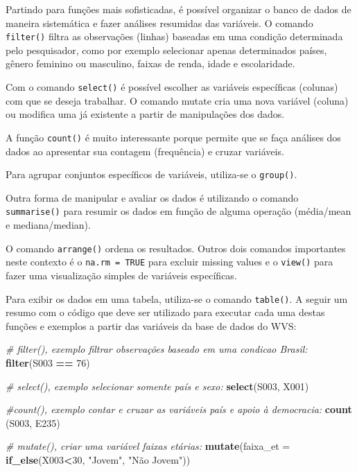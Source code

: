\documentclass[
  brazil,
]{book}
\newenvironment{Shaded}{\begin{snugshade}}{\end{snugshade}}
\newcommand{\CommentTok}[1]{\textcolor[rgb]{0.56,0.35,0.01}{\textit{#1}}}
\newcommand{\DataTypeTok}[1]{\textcolor[rgb]{0.13,0.29,0.53}{#1}}
\newcommand{\DecValTok}[1]{\textcolor[rgb]{0.00,0.00,0.81}{#1}}
\newcommand{\KeywordTok}[1]{\textcolor[rgb]{0.13,0.29,0.53}{\textbf{#1}}}
\newcommand{\NormalTok}[1]{#1}
\newcommand{\OperatorTok}[1]{\textcolor[rgb]{0.81,0.36,0.00}{\textbf{#1}}}
\newcommand{\StringTok}[1]{\textcolor[rgb]{0.31,0.60,0.02}{#1}}
\begin{document}
Partindo para funções mais sofisticadas, é possível organizar o banco de dados de maneira sistemática e fazer análises resumidas das variáveis. O comando \texttt{filter()} filtra as observações (linhas) baseadas em uma condição determinada pelo pesquisador, como por exemplo selecionar apenas determinados países, gênero feminino ou masculino, faixas de renda, idade e escolaridade.

Com o comando \texttt{select()} é possível escolher as variáveis específicas (colunas) com que se deseja trabalhar. O comando mutate cria uma nova variável (coluna) ou modifica uma já existente a partir de manipulações dos dados.

A função \texttt{count()} é muito interessante porque permite que se faça análises dos dados ao apresentar sua contagem (frequência) e cruzar variáveis.

Para agrupar conjuntos específicos de variáveis, utiliza-se o \texttt{group()}.

Outra forma de manipular e avaliar os dados é utilizando o comando \texttt{summarise()} para resumir os dados em função de alguma operação (média/mean e mediana/median).

O comando \texttt{arrange()} ordena os resultados. Outros dois comandos importantes neste contexto é o \texttt{na.rm\ =\ TRUE} para excluir missing values e o \texttt{view()} para fazer uma visualização simples de variáveis específicas.

Para exibir os dados em uma tabela, utiliza-se o comando \texttt{table()}. A seguir um resumo com o código que deve ser utilizado para executar cada uma destas funções e exemplos a partir das variáveis da base de dados do WVS:

\begin{Shaded}
\begin{Highlighting}[]
\CommentTok{# filter(), exemplo filtrar observações baseado em uma condicao Brasil: }
\KeywordTok{filter}\NormalTok{(S003 }\OperatorTok{==}\StringTok{ }\DecValTok{76}\NormalTok{)}

\CommentTok{# select(), exemplo selecionar somente país e sexo: }
\KeywordTok{select}\NormalTok{(S003, X001)}

\CommentTok{#count(), exemplo contar e cruzar as variáveis país e apoio à democracia: }
\KeywordTok{count}\NormalTok{ (S003, E235) }

\CommentTok{# mutate(), criar uma variável faixas etárias: }
\KeywordTok{mutate}\NormalTok{(}\DataTypeTok{faixa_et =} \KeywordTok{if_else}\NormalTok{(X003}\OperatorTok{<}\DecValTok{30}\NormalTok{, }\StringTok{"Jovem"}\NormalTok{, }\StringTok{"Não Jovem"}\NormalTok{))}
\end{Highlighting}
\end{Shaded}
\end{document}
